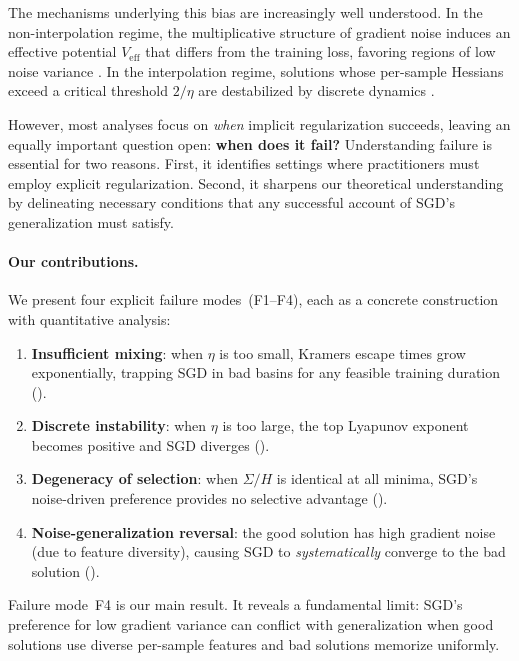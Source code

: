 \documentclass[11pt,a4paper]{article}
\newcommand{\Veff}{V_{\mathrm{eff}}}
\begin{document}
The mechanisms underlying this bias are increasingly well understood.  In the
non-interpolation regime, the multiplicative structure of gradient noise induces
an effective potential $\Veff$ that differs from the training loss, favoring
regions of low noise variance \citep{horsthemke1984noise,chaudhari2018stochastic}.
In the interpolation regime, solutions whose per-sample Hessians exceed a
critical threshold $2/\eta$ are destabilized by discrete dynamics
\citep{wu2023implicit}.

However, most analyses focus on \emph{when} implicit regularization succeeds,
leaving an equally important question open: \textbf{when does it fail?}
Understanding failure is essential for two reasons.  First, it identifies
settings where practitioners must employ explicit regularization.  Second, it
sharpens our theoretical understanding by delineating necessary conditions that
any successful account of SGD's generalization must satisfy.

\paragraph{Our contributions.}
We present four explicit failure modes~(F1--F4), each as a concrete
construction with quantitative analysis:
\begin{enumerate}[label=\textbf{F\arabic*},leftmargin=2em]
  \item \textbf{Insufficient mixing}: when $\eta$ is too small, Kramers escape
        times grow exponentially, trapping SGD in bad basins for any
        feasible training duration ().
  \item \textbf{Discrete instability}: when $\eta$ is too large, the top
        Lyapunov exponent becomes positive and SGD diverges ().
  \item \textbf{Degeneracy of selection}: when $\Sigma/H$ is identical at all
        minima, SGD's noise-driven preference provides no selective advantage
        ().
  \item \textbf{Noise-generalization reversal}: the good solution has high
        gradient noise (due to feature diversity), causing SGD to
        \emph{systematically} converge to the bad solution ().
\end{enumerate}
Failure mode~F4 is our main result.  It reveals a fundamental limit: SGD's
preference for low gradient variance can conflict with generalization when
good solutions use diverse per-sample features and bad solutions memorize
uniformly.
\end{document}
